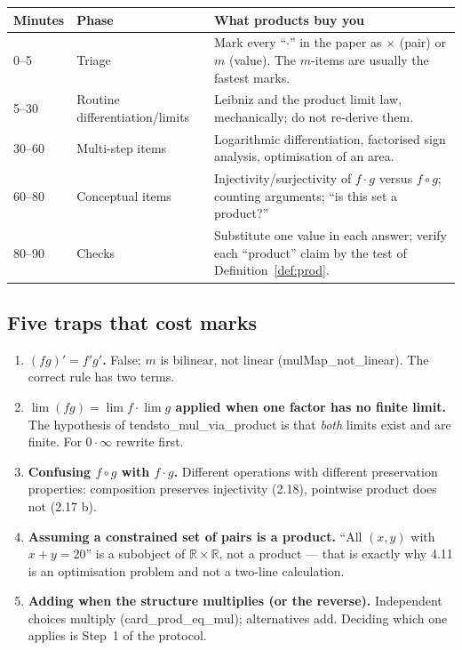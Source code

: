 \documentclass[11pt,a4paper]{article}
\theoremstyle{definition}
\newcommand{\lean}[1]{\textsf{\small #1}}
\begin{document}
\begin{center}
\begin{tabular}{@{}llp{}@{}}
\toprule
\textbf{Minutes} & \textbf{Phase} & \textbf{What products buy you}\\
\midrule
0--5 & Triage & Mark every ``$\cdot$'' in the paper as $\times$ (pair) or $m$ (value).
  The $m$-items are usually the fastest marks.\\
5--30 & Routine differentiation/limits & Leibniz and the product limit law, mechanically;
  do not re-derive them.\\
30--60 & Multi-step items & Logarithmic differentiation, factorised sign analysis,
  optimisation of an area.\\
60--80 & Conceptual items & Injectivity/surjectivity of $f\cdot g$ versus $f\circ g$;
  counting arguments; ``is this set a product?''\\
80--90 & Checks & Substitute one value in each answer; verify each ``product'' claim by the
  test of Definition~\ref{def:prod}.\\
\bottomrule
\end{tabular}
\end{center}

\subsection{Five traps that cost marks}

\begin{enumerate}[nosep]
\item \textbf{$(fg)'=f'g'$.}  False; $m$ is bilinear, not linear
      (\lean{mulMap\_not\_linear}).  The correct rule has two terms.
\item \textbf{$\lim(fg)=\lim f\cdot\lim g$ applied when one factor has no finite limit.}
      The hypothesis of \lean{tendsto\_mul\_via\_product} is that \emph{both} limits exist
      and are finite.  For $0\cdot\infty$ rewrite first.
\item \textbf{Confusing $f\circ g$ with $f\cdot g$.}  Different operations with different
      preservation properties: composition preserves injectivity (2.18), pointwise product
      does not (2.17 b).
\item \textbf{Assuming a constrained set of pairs is a product.}  ``All $(x,y)$ with
      $x+y=20$'' is a subobject of $\mathbb{R}\times\mathbb{R}$, not a product ---
      that is exactly why 4.11 is an optimisation problem and not a two-line calculation.
\item \textbf{Adding when the structure multiplies (or the reverse).}  Independent choices
      multiply (\lean{card\_prod\_eq\_mul}); alternatives add.  Deciding which one applies
      is Step~1 of the protocol.
\end{enumerate}
\end{document}
